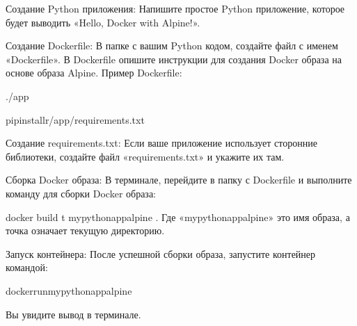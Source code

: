 \documentclass[letterpaper,10pt,russian]{sphinxmanual}
\begin{document}
\sphinxAtStartPar
Создание Python приложения: Напишите простое Python приложение, которое будет выводить «Hello, Docker with Alpine!».

\sphinxAtStartPar
Создание Dockerfile: В папке с вашим Python кодом, создайте файл с именем «Dockerfile». В Dockerfile опишите инструкции для создания Docker образа на основе образа Alpine. Пример Dockerfile:

\begin{sphinxVerbatim}[commandchars=\\\{\}]

./app

pipinstall\PYGZhy{}r/app/requirements.txt


\PYG{p}{[}\PYG{p}{]}
\end{sphinxVerbatim}

\sphinxAtStartPar
Создание requirements.txt: Если ваше приложение использует сторонние библиотеки, создайте файл «requirements.txt» и укажите их там.

\sphinxAtStartPar
Сборка Docker образа: В терминале, перейдите в папку с Dockerfile и выполните команду для сборки Docker образа:

\sphinxAtStartPar
docker build \sphinxhyphen{}t my\sphinxhyphen{}python\sphinxhyphen{}app\sphinxhyphen{}alpine .
Где «my\sphinxhyphen{}python\sphinxhyphen{}app\sphinxhyphen{}alpine» \sphinxhyphen{} это имя образа, а точка означает текущую директорию.

\sphinxAtStartPar
Запуск контейнера: После успешной сборки образа, запустите контейнер командой:

\begin{sphinxVerbatim}[commandchars=\\\{\}]
dockerrunmy\PYGZhy{}python\PYGZhy{}app\PYGZhy{}alpine
\end{sphinxVerbatim}

\sphinxAtStartPar
Вы увидите вывод  в терминале.
\end{document}
